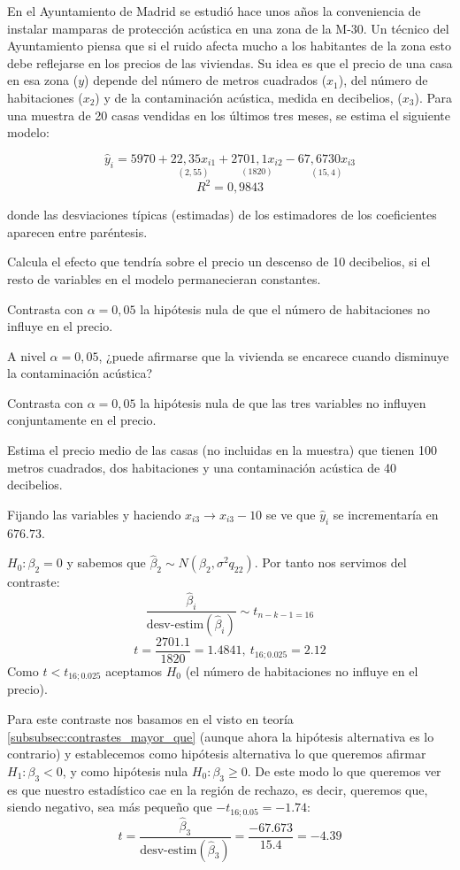 \begin{problem}[7]
	En el Ayuntamiento de Madrid se estudió hace unos años la conveniencia de instalar mamparas de protección acústica en una zona de la M-30. Un técnico del Ayuntamiento piensa que si el ruido afecta mucho a los habitantes de la zona esto debe reflejarse en los precios de las viviendas. Su idea es que el precio de una casa en esa zona ($y$) depende del número de metros cuadrados ($x_1$), del número de habitaciones ($x_2$) y de la contaminación acústica, medida en decibelios, ($x_3$). Para una muestra de 20 casas vendidas en los últimos tres meses, se estima el siguiente modelo:

	\[\hat{y}_i = 5970 + \underset{(2,55)}{22,35 x_{i1}} + \underset{(1820)}{2701,1 x_{i2}} − \underset{(15,4)}{67,6730 x_{i3}}\]
	\[R^2=0,9843\]

	donde las desviaciones típicas (estimadas) de los estimadores de los coeficientes aparecen entre paréntesis.

	\ppart Calcula el efecto que tendría sobre el precio un descenso de 10 decibelios, si el resto de variables en el modelo permanecieran constantes.

	\ppart Contrasta con $α = 0,05$ la hipótesis nula de que el número de habitaciones no influye en el precio.

	\ppart A nivel $α = 0,05$, ¿puede afirmarse que la vivienda se encarece cuando disminuye la contaminación acústica?

	\ppart Contrasta con $α = 0,05$ la hipótesis nula de que las tres variables no influyen conjuntamente en el precio.

	\ppart Estima el precio medio de las casas (no incluidas en la muestra) que tienen 100 metros cuadrados, dos habitaciones y una contaminación acústica de 40 decibelios.


	\solution
	\spart
	Fijando las variables y haciendo $x_{i3} \rightarrow x_{i3}-10$ se ve que $\hat{y}_i$ se incrementaría en $676.73$.

	\spart
	$H_0: β_2 = 0$ y sabemos que $\hat{β}_2 \sim N(β_2, σ^2q_{22})$. Por tanto nos servimos del contraste:
	\[\frac{\hat{β}_i}{\text{desv-estim}(\hat{β}_i)}\sim t_{n-k-1=16}\]
	\[t = \frac{2701.1}{1820} = 1.4841,\ t_{16;0.025}=2.12\]
	Como $t<t_{16;0.025}$ aceptamos $H_0$ (el número de habitaciones no influye en el precio).

	\spart
	Para este contraste nos basamos en el visto en teoría \ref{subsubsec:contrastes_mayor_que} (aunque ahora la hipótesis alternativa es lo contrario) y establecemos como hipótesis alternativa lo que queremos afirmar $H_1:β_3<0$, y como hipótesis nula $H_0: β_3≥0$. De este modo lo que queremos ver es que nuestro estadístico cae en la región de rechazo, es decir, queremos que, siendo negativo, sea más pequeño que $-t_{16;0.05}=-1.74$:
	\[t = \frac{\hat{β}_3}{\text{desv-estim}(\hat{β}_3)} = \frac{-67.673}{15.4} = -4.39\]


\end{problem}
